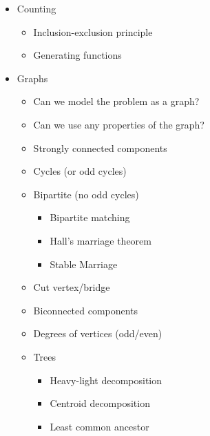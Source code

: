 \documentclass[9pt,a4paper,twocolumn,landscape,oneside]{amsart}
\newenvironment{myitemize}
{ \begin{itemize}[leftmargin=.5cm]
    \setlength{\itemsep}{0pt}
    \setlength{\parskip}{0pt}
    \setlength{\parsep}{0pt}     }
{ \end{itemize}                  }
\begin{document}
\begin{multicols*}{3}
\begin{myitemize}
\begin{itemize}
                        \item Store $2^k$ jump pointers
                        \item $2^k$ merging trick
                    \end{itemize}
                \item Counting
                    \begin{itemize}
                        \item Inclusion-exclusion principle
                        \item Generating functions
                    \end{itemize}
                \item Graphs
                    \begin{itemize}
                        \item Can we model the problem as a graph?
                        \item Can we use any properties of the graph?
                        \item Strongly connected components
                        \item Cycles (or odd cycles)
                        \item Bipartite (no odd cycles)
                            \begin{itemize}
                                \item Bipartite matching
                                \item Hall's marriage theorem
                                \item Stable Marriage
                            \end{itemize}
                        \item Cut vertex/bridge
                        \item Biconnected components
                        \item Degrees of vertices (odd/even)
                        \item Trees
                            \begin{itemize}
                                \item Heavy-light decomposition
                                \item Centroid decomposition
                                \item Least common ancestor
                            \end{itemize}

\end{itemize}
\end{myitemize}
\end{multicols*}
\end{document}
